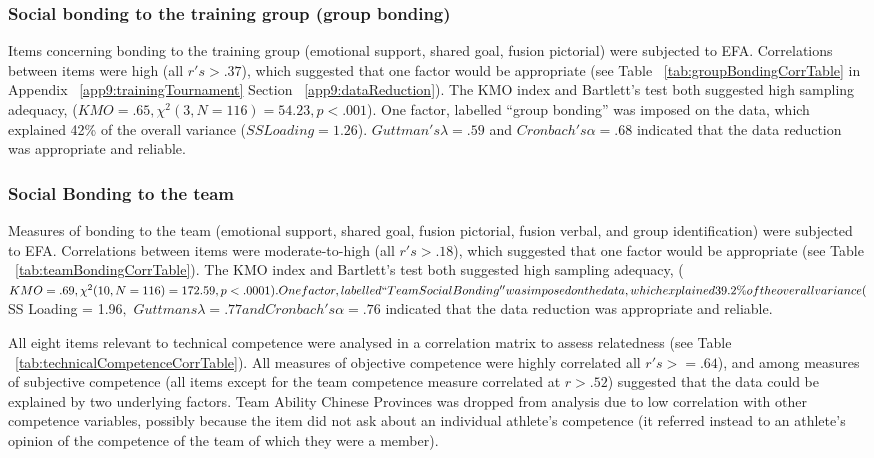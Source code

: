 \subsubsection{Social bonding to the training group (group bonding)}
Items concerning bonding to the training group (emotional support, shared goal, fusion pictorial) were subjected to EFA.  Correlations between items were high (all $r's > .37$), which suggested that one factor would be appropriate (see Table ~\ref{tab:groupBondingCorrTable} in Appendix ~\ref{app9:trainingTournament} Section ~\ref{app9:dataReduction}). The KMO index and Bartlett's test both suggested high sampling adequacy, ($KMO =  .65, \chi^2(3, N = 116) = 54.23, p < .001$).
One factor, labelled ``group bonding'' was imposed on the data, which explained 42\% of the overall variance ($SS Loading = 1.26$). $Guttman's \lambda = .59$ and $Cronbach's \alpha = .68$ indicated that the data reduction was appropriate and reliable.

\subsubsection{Social Bonding to the team \label{app9:teamBondingEFA}}
Measures of bonding to the team (emotional support, shared goal, fusion pictorial, fusion verbal, and group identification) were subjected to EFA.  Correlations between items were moderate-to-high (all $r's > .18$), which suggested that one factor would be appropriate (see Table ~\ref{tab:teamBondingCorrTable}).
The KMO index and Bartlett's test both suggested high sampling adequacy, ($KMO = .69, \chi^2(10, N = 116) = 172.59, p < .0001).
One factor, labelled ``Team Social Bonding'' was imposed on the data, which explained 39.2\% of the overall variance ($SS Loading = 1.96$, $ $Guttmans \lambda = .77 and Cronbach's \alpha = .76$ indicated that the data reduction was appropriate and reliable.


All eight items relevant to technical competence were analysed in a correlation matrix to assess relatedness (see Table ~\ref{tab:technicalCompetenceCorrTable}). All measures of objective competence were highly correlated all $r's >= .64$),  and among measures of subjective competence (all items except for the team competence measure correlated at $r > .52$) suggested that the data could be explained by two underlying factors. Team Ability Chinese Provinces was dropped from analysis due to low correlation with other competence variables, possibly because the item did not ask about an individual athlete’s competence (it referred instead to an athlete’s opinion of the competence of the team of which they were a member).

